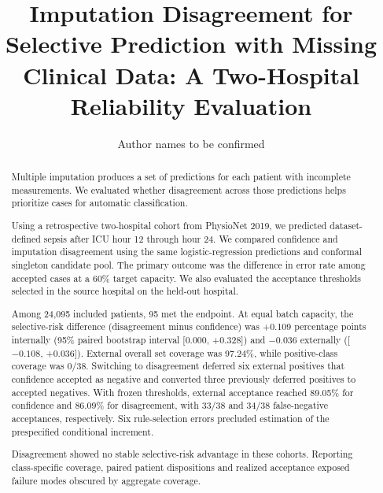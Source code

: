 \documentclass[sigconf,nonacm]{acmart}
\begin{document}
\title{Imputation Disagreement for Selective Prediction with Missing Clinical Data: A Two-Hospital Reliability Evaluation}

\author{Author names to be confirmed}

\begin{abstract}
Multiple imputation produces a set of predictions for each patient with incomplete measurements. We evaluated whether disagreement across those predictions helps prioritize cases for automatic classification.

Using a retrospective two-hospital cohort from PhysioNet 2019, we predicted dataset-defined sepsis after ICU hour 12 through hour 24. We compared confidence and imputation disagreement using the same logistic-regression predictions and conformal singleton candidate pool. The primary outcome was the difference in error rate among accepted cases at a 60\% target capacity. We also evaluated the acceptance thresholds selected in the source hospital on the held-out hospital.

Among 24,095 included patients, 95 met the endpoint. At equal batch capacity, the selective-risk difference (disagreement minus confidence) was +0.109 percentage points internally (95\% paired bootstrap interval [0.000, +0.328]) and $-0.036$ externally ([$-0.108$, +0.036]). External overall set coverage was 97.24\%, while positive-class coverage was 0/38. Switching to disagreement deferred six external positives that confidence accepted as negative and converted three previously deferred positives to accepted negatives. With frozen thresholds, external acceptance reached 89.05\% for confidence and 86.09\% for disagreement, with 33/38 and 34/38 false-negative acceptances, respectively. Six rule-selection errors precluded estimation of the prespecified conditional increment.

Disagreement showed no stable selective-risk advantage in these cohorts. Reporting class-specific coverage, paired patient dispositions and realized acceptance exposed failure modes obscured by aggregate coverage.
\end{abstract}


\maketitle





\end{document}
